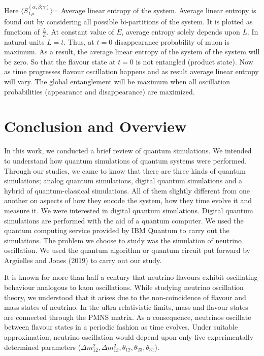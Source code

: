 \documentclass[12pt,a4paper]{report}
\begin{document}
\pagebreak
Here $\langle S^{(\alpha,\beta;\gamma)}_{L\mu}\rangle$= Average linear entropy of the system. Average linear entropy is found out by considering all possible bi-partitions of the system. It is plotted as functiom of $\frac{L}{E}$. At constant value of $E$, average entropy solely depends upon $L$. In natural units $L=t$. Thus, at $t=0$ disappearance probability of muon is maximum. As a result, the average linear entropy of the system of the system will be zero. So that the flavour state at $t=0$ is not entangled (product state). Now as time progresses flavour oscillation happens and as result average linear entropy will vary. The global entanglement will be maximum when all oscillation probabilities (appearance and disappearance) are maximized.  
\newpage
\thispagestyle{empty}
\mbox{}
\newpage
\chapter*{Conclusion and Overview}
In this work, we conducted a brief review of quantum simulations. We intended to understand how quantum simulations of quantum systems were performed. Through our studies, we came to know that there are three kinds of quantum simulations; analog quantum simulations, digital quantum simulations and a hybrid of quantum-classical simulations. All of them slightly different from one another on aspects of how they encode the system, how they time evolve it and measure it. We were interested in digital quantum simulations. Digital quantum simulations are performed with the aid of a quantum computer. We used the quantum computing service provided by IBM Quantum to carry out the simulations. The problem we choose to study was the simulation of neutrino oscillation. We used the quantum algorithm or quantum circuit put forward by Arg\"uelles and Jones (2019) to carry out our study. \par
It is known for more than half a century that neutrino flavours exhibit oscillating behaviour analogous to kaon oscillations. While studying neutrino oscillation theory, we understood that it arises due to the non-coincidence of flavour and mass states of neutrino. In the ultra-relativistic limits, mass and flavour states are connected through the PMNS matrix. As a consequence, neutrinos oscillate between flavour states in a periodic fashion as time evolves. Under suitable approximation, neutrino oscillation would depend upon only five experimentally determined parameters ($\Delta m_{12}^{2},\Delta m_{13}^{2},\theta_{12},\theta_{23},\theta_{31}$).\par
\end{document}
